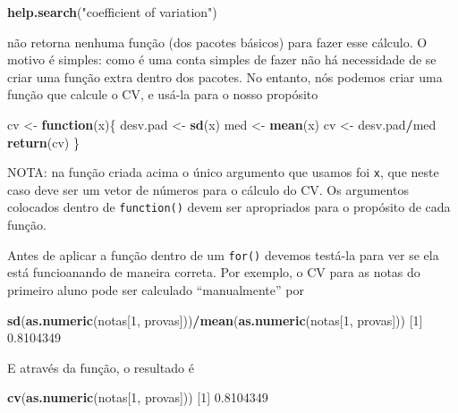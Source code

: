 \documentclass[10pt,a4paper]{book}
\newenvironment{Shaded}{\begin{snugshade}}{\end{snugshade}}
\newcommand{\KeywordTok}[1]{\textcolor[rgb]{0.13,0.29,0.53}{\textbf{#1}}}
\newcommand{\DecValTok}[1]{\textcolor[rgb]{0.00,0.00,0.81}{#1}}
\newcommand{\FloatTok}[1]{\textcolor[rgb]{0.00,0.00,0.81}{#1}}
\newcommand{\StringTok}[1]{\textcolor[rgb]{0.31,0.60,0.02}{#1}}
\newcommand{\ControlFlowTok}[1]{\textcolor[rgb]{0.13,0.29,0.53}{\textbf{#1}}}
\newcommand{\OperatorTok}[1]{\textcolor[rgb]{0.81,0.36,0.00}{\textbf{#1}}}
\newcommand{\NormalTok}[1]{#1}
\begin{document}
\begin{Shaded}
\begin{Highlighting}[]
\KeywordTok{help.search}\NormalTok{(}\StringTok{"coefficient of variation"}\NormalTok{)}
\end{Highlighting}
\end{Shaded}

não retorna nenhuma função (dos pacotes básicos) para fazer esse
cálculo. O motivo é simples: como é uma conta simples de fazer não há
necessidade de se criar uma função extra dentro dos pacotes. No entanto,
nós podemos criar uma função que calcule o CV, e usá-la para o nosso
propósito

\begin{Shaded}
\begin{Highlighting}[]
\NormalTok{cv <-}\StringTok{ }\ControlFlowTok{function}\NormalTok{(x)\{}
\NormalTok{    desv.pad <-}\StringTok{ }\KeywordTok{sd}\NormalTok{(x)}
\NormalTok{    med <-}\StringTok{ }\KeywordTok{mean}\NormalTok{(x)}
\NormalTok{    cv <-}\StringTok{ }\NormalTok{desv.pad}\OperatorTok{/}\NormalTok{med}
    \KeywordTok{return}\NormalTok{(cv)}
\NormalTok{\}}
\end{Highlighting}
\end{Shaded}

NOTA: na função criada acima o único argumento que usamos foi
\texttt{x}, que neste caso deve ser um vetor de números para o cálculo
do CV. Os argumentos colocados dentro de \texttt{function()} devem ser
apropriados para o propósito de cada função.

Antes de aplicar a função dentro de um \texttt{for()} devemos testá-la
para ver se ela está funcioanando de maneira correta. Por exemplo, o CV
para as notas do primeiro aluno pode ser calculado ``manualmente'' por

\begin{Shaded}
\begin{Highlighting}[]
\KeywordTok{sd}\NormalTok{(}\KeywordTok{as.numeric}\NormalTok{(notas[}\DecValTok{1}\NormalTok{, provas]))}\OperatorTok{/}\KeywordTok{mean}\NormalTok{(}\KeywordTok{as.numeric}\NormalTok{(notas[}\DecValTok{1}\NormalTok{, provas]))}
\NormalTok{[}\DecValTok{1}\NormalTok{] }\FloatTok{0.8104349}
\end{Highlighting}
\end{Shaded}

E através da função, o resultado é

\begin{Shaded}
\begin{Highlighting}[]
\KeywordTok{cv}\NormalTok{(}\KeywordTok{as.numeric}\NormalTok{(notas[}\DecValTok{1}\NormalTok{, provas]))}
\NormalTok{[}\DecValTok{1}\NormalTok{] }\FloatTok{0.8104349}
\end{Highlighting}
\end{Shaded}
\end{document}
